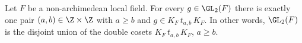Let $F$ be a non-archimedean local field. For every $g\in\GL_2(F)$ there is exactly one pair $(a,b)\in\Z\times\Z$
with $a\ge b$ and $g\in K_F\,t_{a,b}\,K_F$. In other words, $\GL_2(F)$ is the disjoint union of the double cosets
$K_F\,t_{a,b}\,K_F$, $a\ge b$.

